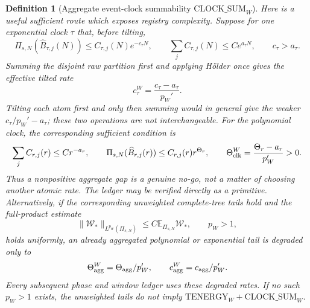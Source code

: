 \documentclass[11pt]{article}
\newtheorem{definition}[theorem]{Definition}
\begin{document}
\begin{definition}[Aggregate event-clock summability
$\mathrm{CLOCK\_SUM}_{W}$]
Here is a useful sufficient route which exposes registry complexity.  Suppose
for one exponential clock $\tau$ that, before tilting,
\begin{equation}
\label{eq:clock-raw-complexity-gap}
 \Pi_{s,N}(\widehat B_{\tau,j}(N))
 \le C_{\tau,j}(N)e^{-c_\tau N},\qquad
 \sum_j C_{\tau,j}(N)\le Ce^{a_\tau N},\qquad c_\tau>a_\tau.
\end{equation}
Summing the disjoint raw partition first and applying H\"older once gives the
effective tilted rate
\begin{equation}
\label{eq:clock-aggregate-holder-rate}
 c_\tau^W=\frac{c_\tau-a_\tau}{p_W'}.
\end{equation}
Tilting each atom first and only then summing would in general give the weaker
$c_\tau/p_W'-a_\tau$; these two operations are not interchangeable.  For the
polynomial clock, the corresponding sufficient condition is
\begin{equation}
\label{eq:clock-polynomial-complexity-gap}
 \sum_j C_{r,j}(r)\le Cr^{-a_r},\qquad
 \Pi_{s,N}(\widehat B_{r,j}(r))\le C_{r,j}(r)r^{\Theta_r},
 \qquad
 \Theta_{\rm clk}^{W}=\frac{\Theta_r-a_r}{p_W'}>0.
\end{equation}
Thus a nonpositive aggregate gap is a genuine no-go, not a matter of choosing
another atomic rate.
The ledger may be verified directly as a primitive.  Alternatively, if the
corresponding unweighted complete-tree tails hold and the full-product
estimate
\begin{equation}
\label{eq:full-product-Lp-energy-route}
 \|\mathscr W_*\|_{L^{p_W}(\Pi_{s,N})}
 \le C\mathbb E_{\Pi_{s,N}}\mathscr W_*,
 \qquad p_W>1,
\end{equation}
holds uniformly, an already aggregated polynomial or exponential tail is
degraded only to
\begin{equation}
\label{eq:holder-degraded-energy-rates}
 \Theta_{\rm agg}^{W}=\Theta_{\rm agg}/p_W',\qquad
 c_{\rm agg}^{W}=c_{\rm agg}/p_W'.
\end{equation}
Every subsequent phase and window ledger uses these degraded rates.  If no
such $p_W>1$ exists, the unweighted tails do not imply
$\mathrm{TENERGY}_{W}+\mathrm{CLOCK\_SUM}_{W}$.
\end{definition}
\end{document}
